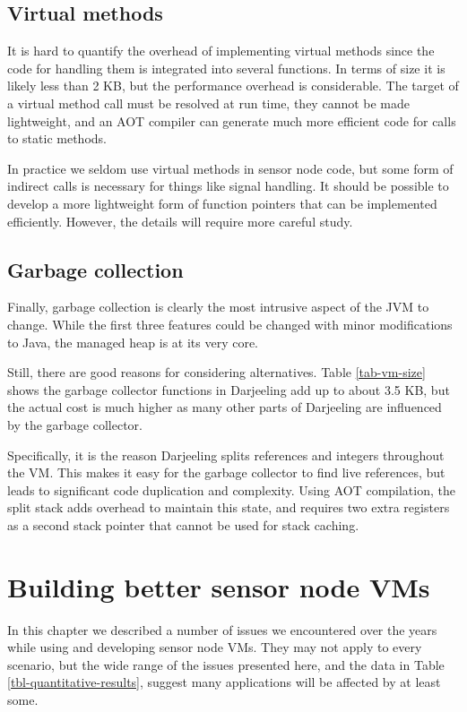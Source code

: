 \subsection{Virtual methods}
It is hard to quantify the overhead of implementing virtual methods since the code for handling them is integrated into several functions. In terms of size it is likely less than 2 KB, but the performance overhead is considerable. The target of a virtual method call must be resolved at run time, they cannot be made lightweight, and an AOT compiler can generate much more efficient code for calls to static methods.

In practice we seldom use virtual methods in sensor node code, but some form of indirect calls is necessary for things like signal handling. It should be possible to develop a more lightweight form of function pointers that can be implemented efficiently. However, the details will require more careful study.


\subsection{Garbage collection}
Finally, garbage collection is clearly the most intrusive aspect of the JVM to change. While the first three features could be changed with minor modifications to Java, the managed heap is at its very core.

Still, there are good reasons for considering alternatives. Table \ref{tab-vm-size} shows the garbage collector functions in Darjeeling add up to about 3.5 KB, but the actual cost is much higher as many other parts of Darjeeling are influenced by the garbage collector.

Specifically, it is the reason Darjeeling splits references and integers throughout the VM. This makes it easy for the garbage collector to find live references, but leads to significant code duplication and complexity. Using AOT compilation, the split stack adds overhead to maintain this state, and requires two extra registers as a second stack pointer that cannot be used for stack caching.




\section{Building better sensor node VMs}
In this chapter we described a number of issues we encountered over the years while using and developing sensor node VMs. They may not apply to every scenario, but the wide range of the issues presented here, and the data in Table \ref{tbl-quantitative-results}, suggest many applications will be affected by at least some.

